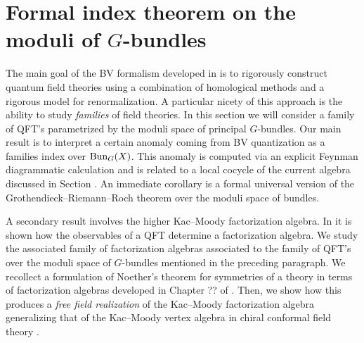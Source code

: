 \def\Bun{{\rm Bun}}

\section{Formal index theorem on the moduli of $G$-bundles}

%

The main goal of the BV formalism developed in \cite{CosBook} is to rigorously construct quantum field theories using a combination of homological methods and a rigorous model for renormalization. 
A particular nicety of this approach is the ability to study {\em families} of field theories. 
In this section we will consider a family of QFT's parametrized by the moduli space of principal $G$-bundles. 
Our main result is to interpret a certain anomaly coming from BV quantization as a families index over ${\rm Bun}_G(X)$. 
This anomaly is computed via an explicit Feynman diagrammatic calculation and is related to a local cocycle of the current algebra discussed in Section . 
An immediate corollary is a formal universal version of the Grothendieck--Riemann--Roch theorem over the moduli space of bundles. 

A secondary result involves the higher Kac--Moody factorization algebra. 
In \cite{CG1, CG2} it is shown how the observables of a QFT determine a factorization algebra. 
We study the associated family of factorization algebras associated to the family of QFT's over the moduli space of $G$-bundles mentioned in the preceding paragraph. 
We recollect a formulation of Noether's theorem for symmetries of a theory in terms of factorization algebras developed in Chapter ?? of \cite{CG2}. 
Then, we show how this produces a {\em free field realization} of the Kac--Moody factorization algebra generalizing that of the Kac--Moody vertex algebra in chiral conformal field theory \cite{??}. 

